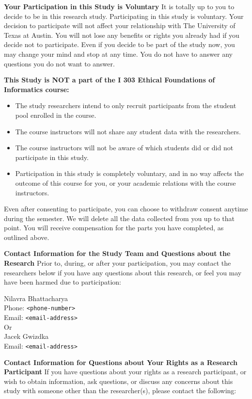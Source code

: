 \documentclass[letterpaper, nobind]{templates/ociamthesis}
\providecommand{\tightlist}{%
  \setlength{\itemsep}{0pt}\setlength{\parskip}{0pt}}
\begin{document}
\textbf{Your Participation in this Study is Voluntary}
It is totally up to you to decide to be in this research study. Participating in this study is voluntary. Your decision to participate will not affect your relationship with The University of Texas at Austin. You will not lose any benefits or rights you already had if you decide not to participate. Even if you decide to be part of the study now, you may change your mind and stop at any time. You do not have to answer any questions you do not want to answer.

\textbf{This Study is NOT a part of the I 303 Ethical Foundations of Informatics course:}

\begin{itemize}
\tightlist
\item
  The study researchers intend to only recruit participants from the student pool enrolled in the course.
\item
  The course instructors will not share any student data with the researchers.
\item
  The course instructors will not be aware of which students did or did not participate in this study.
\item
  Participation in this study is completely voluntary, and in no way affects the outcome of this course for you, or your academic relations with the course instructors.
\end{itemize}

Even after consenting to participate, you can choose to withdraw consent anytime during the semester. We will delete all the data collected from you up to that point. You will receive compensation for the parts you have completed, as outlined above.

\textbf{Contact Information for the Study Team and Questions about the Research}
Prior to, during, or after your participation, you may contact the researchers below if you have any questions about this research, or feel you may have been harmed due to participation:

Nilavra Bhattacharya\\
Phone: \texttt{\textless{}phone-number\textgreater{}}\\
Email: \texttt{\textless{}email-address\textgreater{}}\\
Or\\
Jacek Gwizdka\\
Email: \texttt{\textless{}email-address\textgreater{}}

\textbf{Contact Information for Questions about Your Rights as a Research Participant}
If you have questions about your rights as a research participant, or wish to obtain information, ask questions, or discuss any concerns about this study with someone other than the researcher(s), please contact the following:
\end{document}

